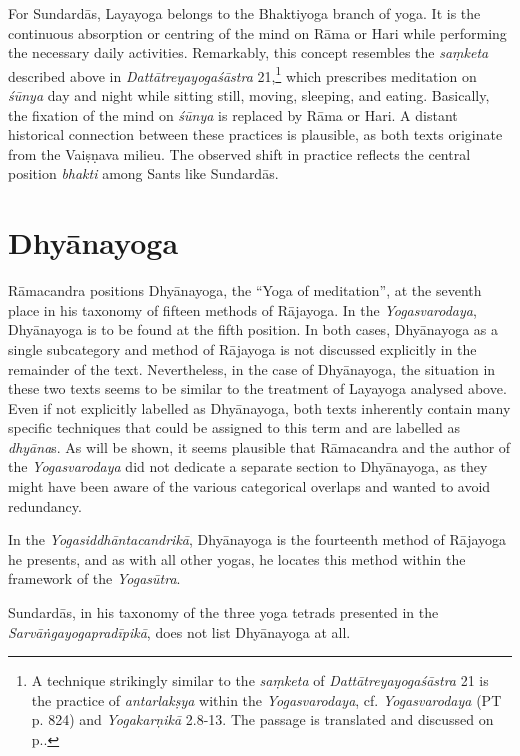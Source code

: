 For Sundardās, Layayoga belongs to the Bhaktiyoga branch of yoga. It is the continuous absorption or centring of the mind on Rāma or Hari while performing the necessary daily activities. Remarkably, this concept resembles the \textit{saṃketa} described above in \emph{Dattātreyayogaśāstra} 21,\footnote{A technique strikingly similar to the \textit{saṃketa} of \emph{Dattātreyayogaśāstra} 21 is the practice of \textit{antarlakṣya} within the \textit{Yogasvarodaya}, cf. \textit{Yogasvarodaya} (PT p. 824) and \textit{Yogakarṇikā} 2.8-13. The passage is translated and discussed on p.\pageref{antarsvayotrans}.} which prescribes meditation on \textit{śūnya} day and night while sitting still, moving, sleeping, and eating. Basically, the fixation of the mind on \textit{śūnya} is replaced by Rāma or Hari. A distant historical connection between these practices is plausible, as both texts originate from the Vaiṣṇava milieu. The observed shift in practice reflects the central position \textit{bhakti} among Sants like Sundardās.

\section{Dhyānayoga}
\label{dhyānayogaintro}

Rāmacandra positions Dhyānayoga, the ``Yoga of meditation'', at the seventh place in his taxonomy of fifteen methods of Rājayoga. In the \textit{Yogasvarodaya}, Dhyānayoga is to be found at the fifth position. In both cases, Dhyānayoga as a single subcategory and method of Rājayoga is not discussed explicitly in the remainder of the text. Nevertheless, in the case of Dhyānayoga, the situation in these two texts seems to be similar to the treatment of Layayoga analysed above. Even if not explicitly labelled as Dhyānayoga, both texts inherently contain many specific techniques that could be assigned to this term and are labelled as \textit{dhyāna}s. As will be shown, it seems plausible that Rāmacandra and the author of the \emph{Yogasvarodaya} did not dedicate a separate section to Dhyānayoga, as they might have been aware of the various categorical overlaps and wanted to avoid redundancy.

In the \textit{Yogasiddhāntacandrikā}, Dhyānayoga is the fourteenth method of Rājayoga he presents, and as with all other yogas, he locates this method within the framework of the \emph{Yogasūtra}.

Sundardās, in his taxonomy of the three yoga tetrads presented in the \textit{Sarvāṅgayogapradīpikā}, does not list Dhyānayoga at all.

